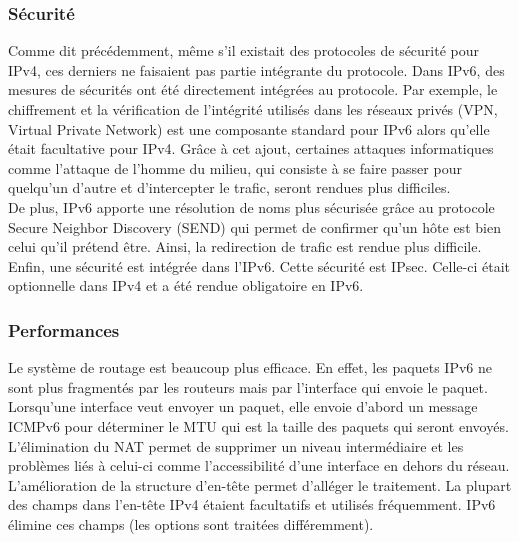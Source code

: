 \subsubsection{Sécurité}
Comme dit précédemment, même s'il existait des protocoles de sécurité pour IPv4, 
ces derniers ne faisaient pas partie intégrante du protocole.
Dans IPv6, des mesures de sécurités ont été directement intégrées au protocole.
Par exemple, le chiffrement et la vérification de l'intégrité utilisés dans les réseaux privés 
(VPN, Virtual Private Network) est une composante standard pour IPv6 alors qu'elle était 
facultative pour IPv4. Grâce à cet ajout, certaines attaques informatiques comme l'attaque de 
l'homme du milieu, qui consiste à se faire passer pour quelqu'un d'autre et d'intercepter 
le trafic, seront rendues plus difficiles.
\\
De plus, IPv6 apporte une résolution de noms plus sécurisée grâce au protocole Secure Neighbor
Discovery (SEND) qui permet de confirmer qu'un hôte est bien celui qu'il prétend être. Ainsi, la redirection de trafic est rendue plus difficile.
\\
Enfin, une sécurité est intégrée dans l'IPv6. Cette sécurité est IPsec. Celle-ci était optionnelle 
dans IPv4 et a été rendue obligatoire en IPv6.
\subsubsection{Performances}

Le système de routage est beaucoup plus efficace. En effet, les paquets IPv6 ne sont plus
fragmentés par les routeurs mais par l'interface qui envoie le paquet. Lorsqu'une interface
veut envoyer un paquet, elle envoie d'abord un message ICMPv6 pour déterminer le MTU qui est 
la taille des paquets qui seront envoyés.
\\
L'élimination du NAT permet de supprimer un niveau intermédiaire et les problèmes liés à celui-ci
 comme l'accessibilité d'une interface en dehors du réseau.
\\	
L'amélioration de la structure d'en-tête permet d'alléger le traitement. La
plupart des champs dans l'en-tête IPv4 étaient facultatifs et utilisés
fréquemment. IPv6 élimine ces champs (les options sont traitées différemment).
